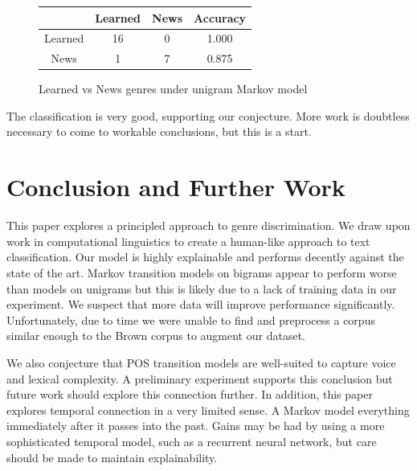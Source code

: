 \documentclass{article}
\begin{document}
\begin{figure}[ht!]
\centering
\begin{tabular}{|c|c|c|c|}
\hline
 & Learned & News & Accuracy\\
\hline
Learned & 16 & 0 & 1.000\\
\hline
News & 1 & 7 & 0.875\\
\hline
\end{tabular}
\caption{Learned vs News genres under unigram Markov model}
\end{figure}
The classification is very good, supporting our conjecture. More work is doubtless necessary to come to workable conclusions, but this is a start.

\section{Conclusion and Further Work}
This paper explores a principled approach to genre discrimination. We draw upon work in computational linguistics to create a human-like approach to text classification. Our model is highly explainable and performs decently against the state of the art. Markov transition models on bigrams appear to perform worse than models on unigrams but this is likely due to a lack of training data in our experiment. We suspect that more data will improve performance significantly. Unfortunately, due to time we were unable to find and preprocess a corpus similar enough to the Brown corpus to augment our dataset.

We also conjecture that POS transition models are well-suited to capture voice and lexical complexity. A preliminary experiment supports this conclusion but future work should explore this connection further. In addition, this paper explores temporal connection in a very limited sense. A Markov model  everything immediately after it passes into the past. Gains may be had by using a more sophisticated temporal model, such as a recurrent neural network, but care should be made to maintain explainability.
\end{document}
